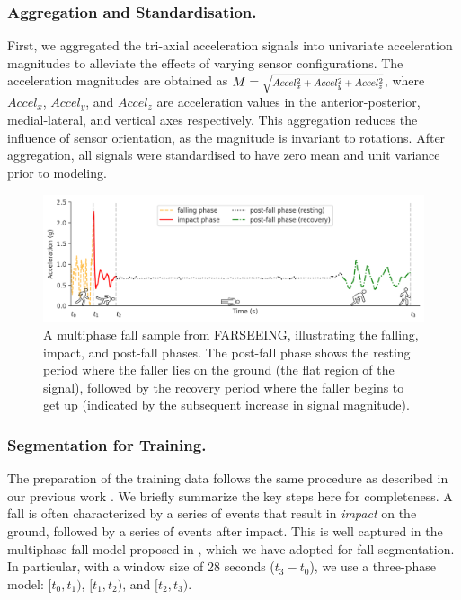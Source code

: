 \documentclass[runningheads]{llncs}
\newcommand{\inlineRoot}[1]{\scalebox{0.8}{$\sqrt{#1}$}}
\begin{document}
\subsubsection{Aggregation and Standardisation.} First, we aggregated the tri-axial acceleration signals into univariate acceleration magnitudes to alleviate the effects of varying sensor configurations. The acceleration magnitudes are obtained as $M = \inlineRoot{Accel_x^2 + Accel_y^2 + Accel_z^2}$, where $Accel_x$, $Accel_y$, and $Accel_z$ are acceleration values in the anterior-posterior, medial-lateral, and vertical axes respectively. This aggregation reduces the influence of sensor orientation, as the magnitude is invariant to rotations. After aggregation, all signals were standardised to have zero mean and unit variance prior to modeling.

\begin{figure}[t]
\includegraphics[width=\textwidth]{img/multiphase.pdf}
\caption{A multiphase fall sample from FARSEEING, illustrating the falling, impact, and post-fall phases. The post-fall phase shows the resting period where the faller lies on the ground (the flat region of the signal), followed by the recovery period where the faller begins to get up (indicated by the subsequent increase in signal magnitude).} \label{fig:multiphase}
\end{figure}

\subsubsection{Segmentation for Training.}
The preparation of the training data follows the same procedure as described in our previous work \cite{aderinola2024accurate}. We briefly summarize the key steps here for completeness. A fall is often characterized by a series of events that result in \textit{impact} on the ground, followed by a series of events after impact.  This is well captured in the multiphase fall model proposed in \cite{becker2012proposal}, which we have adopted for fall segmentation. In particular, with a window size of 28 seconds ($t_3 - t_0$), we use a three-phase model: $[t_0, t_1)$, $[t_1, t_2)$, and $[t_2, t_3)$.
\end{document}
